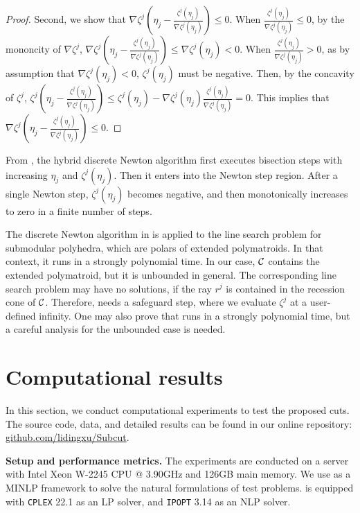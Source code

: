 \begin{proof}
Second, we show that $\nabla \zeta^j(\eta_j - \frac{\zeta^j(\eta_j)}{\nabla\zeta^j(\eta_j)}) \le 0$. When $\frac{\zeta^j(\eta_j)}{\nabla\zeta^j(\eta_j)} \le 0$, by the mononcity of $\nabla \zeta^j$, $\nabla \zeta^j(\eta_j - \frac{\zeta^j(\eta_j)}{\nabla\zeta^j(\eta_j)}) \le \nabla \zeta^j(\eta_j) < 0$. When $\frac{\zeta^j(\eta_j)}{\nabla\zeta^j(\eta_j)} > 0$, as by assumption that $\nabla\zeta^j(\eta_j) < 0$, $\zeta^j(\eta_j)$ must be negative. Then, by the concavity of $\zeta^j$, $\zeta^j(\eta_j - \frac{\zeta^j(\eta_j)}{\nabla\zeta^j(\eta_j)}) \le \zeta^j(\eta_j) - \nabla\zeta^j(\eta_j)\frac{\zeta^j(\eta_j)}{\nabla\zeta^j(\eta_j)} = 0$. This implies that $\nabla \zeta^j(\eta_j - \frac{\zeta^j(\eta_j)}{\nabla\zeta^j(\eta_j)}) \le 0$.
\end{proof}
From ,  the hybrid discrete Newton algorithm first executes bisection steps with increasing $\eta_j$ and $\zeta^j(\eta_j)$. Then it enters into the Newton step region. After a single Newton step, $\zeta^j(\eta_j)$ becomes negative, and then monotonically increases to zero in a finite number of steps. 

The discrete Newton algorithm in \cite{Goemans} is applied to the line search problem for submodular polyhedra, which are polars of extended polymatroids. In that context, it runs in a strongly polynomial time. In our case, $\mathcal C$ contains the extended polymatroid, but it is unbounded in general. The corresponding line search problem may have no solutions, if the  ray  $r^j$ is contained in the recession cone of $\mathcal C$. Therefore,  needs a safeguard step, where we evaluate $\zeta^j$ at a user-defined infinity. One may also prove that  runs in a strongly polynomial time, but a careful analysis for the unbounded case is needed. 

\section{Computational results}
\label{sec.cresult}
In this section, we conduct computational experiments to test the proposed cuts. The source code, data, and detailed results can be found in our online repository: \href{https://github.com/lidingxu/Subcut}{github.com/lidingxu/Subcut}.


\textbf{Setup and performance metrics.}  The experiments are conducted on a server with  Intel Xeon W-2245 CPU @ 3.90GHz and 126GB main memory. We use  \cite{bestuzheva2021scip} as a MINLP framework to solve the natural  formulations of test problems.  \scip is equipped with \texttt{CPLEX} 22.1 as an LP solver, and \texttt{IPOPT} 3.14 as an NLP solver.


